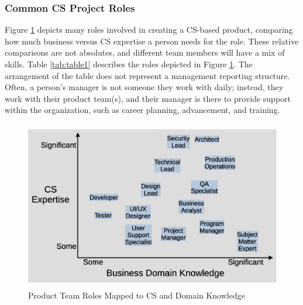 \subsubsection{Common CS Project Roles}
Figure \ref{fig:figure2} depicts many roles involved in creating a CS-based product, comparing how much business versus CS expertise a person needs for the role. These relative comparisons are not absolutes, and different team members will have a mix of skills. Table \ref{tab:table1} describes the roles depicted in Figure \ref{fig:figure2}. The arrangement of the table does not represent a management reporting structure. Often, a person's manager is not someone they work with daily; instead, they work with their product team(s), and their manager is there to provide support within the organization, such as career planning, advancement, and training. 

\begin{figure}[H]
	\begin{center}
		\caption{Product Team Roles Mapped to CS and Domain Knowledge}
		\label{fig:figure2}
		\vskip 4pt
		\includegraphics[height=2.9in]{figs2/cs-team-roles-knowledge-area.eps}
	\end{center}
\end{figure}



